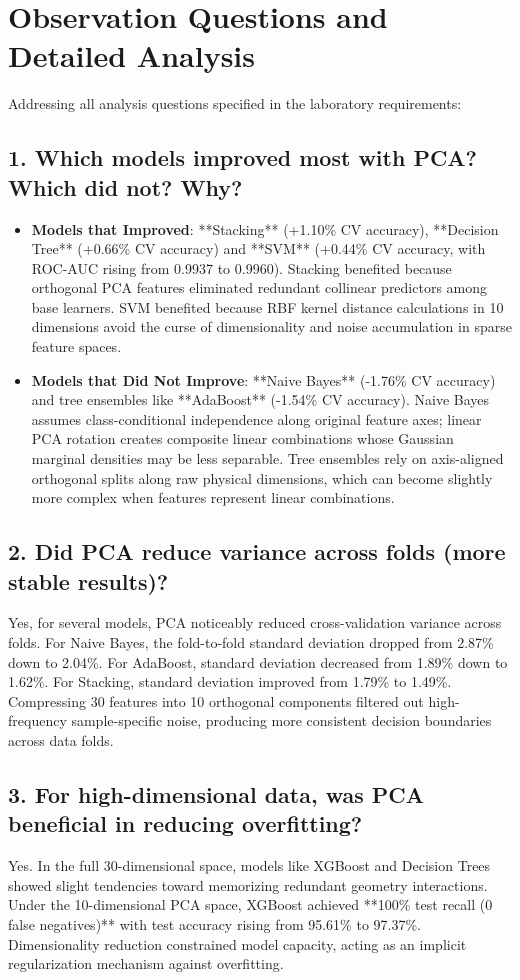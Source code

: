 \documentclass[12pt,a4paper]{article}
\begin{document}
\section{Observation Questions and Detailed Analysis}

Addressing all analysis questions specified in the laboratory requirements:

\subsection*{1. Which models improved most with PCA? Which did not? Why?}
\begin{itemize}
\item \textbf{Models that Improved}: **Stacking** (+1.10\% CV accuracy), **Decision Tree** (+0.66\% CV accuracy) and **SVM** (+0.44\% CV accuracy, with ROC-AUC rising from 0.9937 to 0.9960). Stacking benefited because orthogonal PCA features eliminated redundant collinear predictors among base learners. SVM benefited because RBF kernel distance calculations in 10 dimensions avoid the curse of dimensionality and noise accumulation in sparse feature spaces.
\item \textbf{Models that Did Not Improve}: **Naive Bayes** (-1.76\% CV accuracy) and tree ensembles like **AdaBoost** (-1.54\% CV accuracy). Naive Bayes assumes class-conditional independence along original feature axes; linear PCA rotation creates composite linear combinations whose Gaussian marginal densities may be less separable. Tree ensembles rely on axis-aligned orthogonal splits along raw physical dimensions, which can become slightly more complex when features represent linear combinations.
\end{itemize}

\subsection*{2. Did PCA reduce variance across folds (more stable results)?}
Yes, for several models, PCA noticeably reduced cross-validation variance across folds. For Naive Bayes, the fold-to-fold standard deviation dropped from 2.87\% down to 2.04\%. For AdaBoost, standard deviation decreased from 1.89\% down to 1.62\%. For Stacking, standard deviation improved from 1.79\% to 1.49\%. Compressing 30 features into 10 orthogonal components filtered out high-frequency sample-specific noise, producing more consistent decision boundaries across data folds.

\subsection*{3. For high-dimensional data, was PCA beneficial in reducing overfitting?}
Yes. In the full 30-dimensional space, models like XGBoost and Decision Trees showed slight tendencies toward memorizing redundant geometry interactions. Under the 10-dimensional PCA space, XGBoost achieved **100\% test recall (0 false negatives)** with test accuracy rising from 95.61\% to 97.37\%. Dimensionality reduction constrained model capacity, acting as an implicit regularization mechanism against overfitting.
\end{document}
